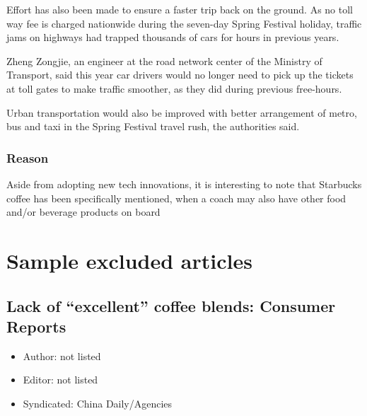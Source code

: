 \begin{displayquote}
	Effort has also been made to ensure a faster trip back on the ground. As
	no toll way fee is charged nationwide during the seven-day Spring
	Festival holiday, traffic jams on highways had trapped thousands of cars
	for hours in previous years.

	Zheng Zongjie, an engineer at the road network center of the Ministry of
	Transport, said this year car drivers would no longer need to pick up
	the tickets at toll gates to make traffic smoother, as they did during
	previous free-hours.

	Urban transportation would also be improved with better arrangement of
	metro, bus and taxi in the Spring Festival travel rush, the authorities
	said.

\end{displayquote}

\subsection{Reason}

Aside from adopting new tech innovations, it is interesting to note that
Starbucks coffee has been specifically mentioned, when a coach may also have
other food and/or beverage products on board

\chapter{Sample excluded articles}\label{appdx:news-articles-ninc}

\section{Lack of ``excellent'' coffee blends: Consumer Reports}

\begin{itemize}
	\item Author: not listed
	\item Editor: not listed
	\item Syndicated: China Daily/Agencies
\end{itemize}

